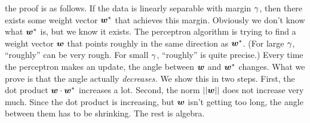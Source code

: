 \documentclass[trans]{beamer}
\begin{document}
the proof is as follows.  If the data is linearly separable with
margin $\gamma$, then there exists some weight vector ${\boldsymbol{w}}^*$ that
achieves this margin.  Obviously we don't know what ${\boldsymbol{w}}^*$ is, but we
know it exists.  The perceptron algorithm is trying to find a weight
vector ${\boldsymbol{w}}$ that points roughly in the same direction as ${\boldsymbol{w}}^*$.
(For large $\gamma$, ``roughly'' can be very rough.  For small $\gamma$,
``roughly'' is quite precise.)  Every time the perceptron makes an
update, the angle between ${\boldsymbol{w}}$ and ${\boldsymbol{w}}^*$ changes.  What we prove is
that the angle actually \emph{decreases.}  We show this in two steps.
First, the dot product ${\boldsymbol{w}} \cdot {\boldsymbol{w}}^*$ increases a lot.  Second,
the norm $\left\vert\left\vert {\boldsymbol{w}} \right\vert\right\vert$ does not increase very much.  Since the dot
product is increasing, but ${\boldsymbol{w}}$ isn't getting too long, the angle
between them has to be shrinking.  The rest is algebra.
\end{document}
